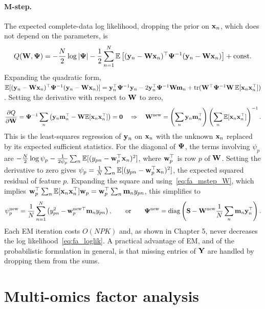 \paragraph{M-step.} The expected complete-data log likelihood, dropping the prior on $\mathbf{x}_n$, which does not depend on the parameters, is
\begin{equation}
  Q(\mathbf{W},\boldsymbol{\Psi}) = -\frac N2\log|\boldsymbol{\Psi}|-\frac12\sum_{n=1}^N\mathbb{E}\left[(\mathbf{y}_n-\mathbf{W}\mathbf{x}_n)^\top\boldsymbol{\Psi}^{-1}(\mathbf{y}_n-\mathbf{W}\mathbf{x}_n)\right]+\text{const}.
\end{equation}
Expanding the quadratic form, $\mathbb{E}[(\mathbf{y}_n-\mathbf{W}\mathbf{x}_n)^\top\boldsymbol{\Psi}^{-1}(\mathbf{y}_n-\mathbf{W}\mathbf{x}_n)]=\mathbf{y}_n^\top\boldsymbol{\Psi}^{-1}\mathbf{y}_n-2\mathbf{y}_n^\top\boldsymbol{\Psi}^{-1}\mathbf{W}\mathbf{m}_n+\operatorname{tr}(\mathbf{W}^\top\boldsymbol{\Psi}^{-1}\mathbf{W}\,\mathbb{E}[\mathbf{x}_n\mathbf{x}_n^\top])$. Setting the derivative with respect to $\mathbf{W}$ to zero,
\begin{equation}
  \frac{\partial Q}{\partial\mathbf{W}}=\boldsymbol{\Psi}^{-1}\sum_n\left(\mathbf{y}_n\mathbf{m}_n^\top-\mathbf{W}\mathbb{E}[\mathbf{x}_n\mathbf{x}_n^\top]\right)=\mathbf{0}
  \quad\Rightarrow\quad
  \mathbf{W}^{\text{new}}=\left(\sum_n\mathbf{y}_n\mathbf{m}_n^\top\right)\left(\sum_n\mathbb{E}[\mathbf{x}_n\mathbf{x}_n^\top]\right)^{-1}.
  \label{eq:fa_mstep_W}
\end{equation}
This is the least-squares regression of $\mathbf{y}_n$ on $\mathbf{x}_n$ with the unknown $\mathbf{x}_n$ replaced by its expected sufficient statistics. For the diagonal of $\boldsymbol{\Psi}$, the terms involving $\psi_p$ are $-\frac N2\log\psi_p-\frac1{2\psi_p}\sum_n\mathbb{E}[(y_{pn}-\mathbf{w}_p^\top\mathbf{x}_n)^2]$, where $\mathbf{w}_p^\top$ is row $p$ of $\mathbf{W}$. Setting the derivative to zero gives $\psi_p=\frac1N\sum_n\mathbb{E}[(y_{pn}-\mathbf{w}_p^\top\mathbf{x}_n)^2]$, the expected squared residual of feature $p$. Expanding the square and using~\eqref{eq:fa_mstep_W}, which implies $\mathbf{w}_p^\top\sum_n\mathbb{E}[\mathbf{x}_n\mathbf{x}_n^\top]\mathbf{w}_p=\mathbf{w}_p^\top\sum_n\mathbf{m}_ny_{pn}$, this simplifies to
\begin{equation}
  \psi_p^{\text{new}}=\frac1N\sum_{n=1}^N\left(y_{pn}^2-\mathbf{w}_p^{\text{new}\top}\mathbf{m}_ny_{pn}\right),
  \qquad\text{or}\qquad
  \boldsymbol{\Psi}^{\text{new}}=\operatorname{diag}\left(\mathbf{S}-\mathbf{W}^{\text{new}}\frac1N\sum_n\mathbf{m}_n\mathbf{y}_n^\top\right).
\end{equation}
Each EM iteration costs $O(NPK)$ and, as shown in Chapter 5, never decreases the log likelihood~\eqref{eq:fa_loglik}. A practical advantage of EM, and of the probabilistic formulation in general, is that missing entries of $\mathbf{Y}$ are handled by dropping them from the sums.

\section{Multi-omics factor analysis}
\label{sec:mofa}

